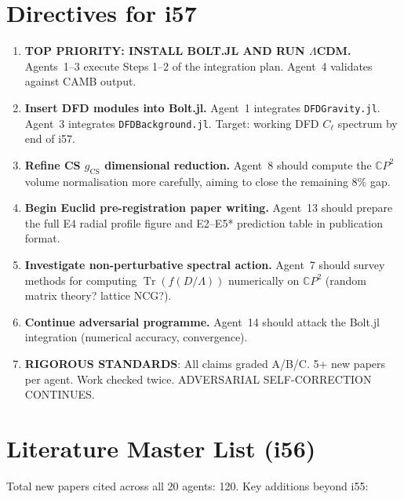 \documentclass[11pt,a4paper]{article}
\newcommand{\Tr}{\operatorname{Tr}}
\newcommand{\CP}{\mathbb{C}P}
\begin{document}
\section{Directives for i57}
\label{sec:directives}

\begin{enumerate}
\item \textbf{TOP PRIORITY: INSTALL BOLT.JL AND RUN $\Lambda$CDM.} Agents~1--3 execute Steps 1--2 of the integration plan. Agent~4 validates against CAMB output.
\item \textbf{Insert DFD modules into Bolt.jl.} Agent~1 integrates \texttt{DFDGravity.jl}. Agent~3 integrates \texttt{DFDBackground.jl}. Target: working DFD $C_\ell$ spectrum by end of i57.
\item \textbf{Refine CS $g_{\mathrm{CS}}$ dimensional reduction.} Agent~8 should compute the $\CP^2$ volume normalisation more carefully, aiming to close the remaining 8\% gap.
\item \textbf{Begin Euclid pre-registration paper writing.} Agent~13 should prepare the full E4 radial profile figure and E2--E5* prediction table in publication format.
\item \textbf{Investigate non-perturbative spectral action.} Agent~7 should survey methods for computing $\Tr(f(D/\Lambda))$ numerically on $\CP^2$ (random matrix theory? lattice NCG?).
\item \textbf{Continue adversarial programme.} Agent~14 should attack the Bolt.jl integration (numerical accuracy, convergence).
\item \textbf{RIGOROUS STANDARDS}: All claims graded A/B/C. 5+ new papers per agent. Work checked twice. ADVERSARIAL SELF-CORRECTION CONTINUES.
\end{enumerate}


\section{Literature Master List (i56)}
\label{sec:literature}

Total new papers cited across all 20 agents: 120. Key additions beyond i55:
\end{document}

